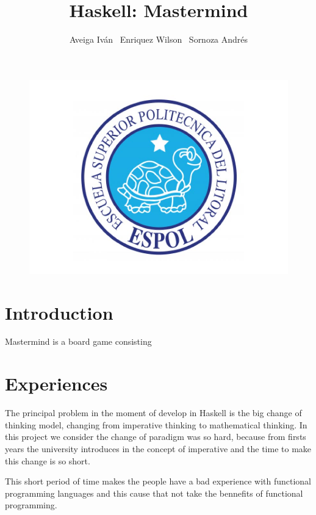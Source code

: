 \documentclass[a4paper,11pt]{book}
\begin{document}
\author{
	Aveiga Iván \ Enriquez Wilson \ Sornoza Andrés
}
\title{Haskell: Mastermind}
\maketitle
\begin{figure}[h]
\centering
\includegraphics[width=0.7\linewidth]{./logo}
\end{figure}

\newpage

\section{Introduction}
Mastermind is a board game consisting



\section{Experiences}
The principal problem in the moment of develop in Haskell is the big change of thinking model, changing from imperative thinking to mathematical thinking. In this project we consider the change of paradigm was so hard, because from firsts years the university introduces in the concept of imperative and the time to make this change is so short. 

This short period of time makes the people have a bad experience with functional programming languages and this cause that not take the bennefits of functional programming.
\end{document}
